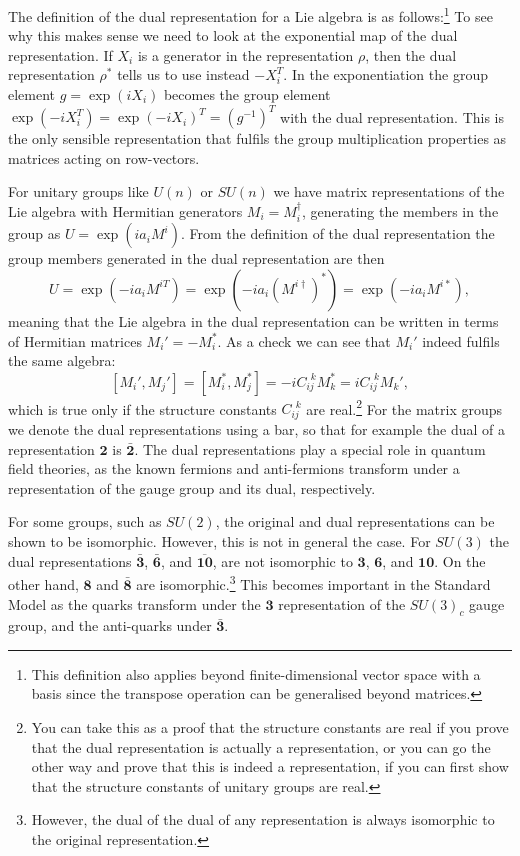 \documentclass[notes.tex]{subfiles}
\begin{document}
The definition of the dual representation for a Lie algebra is as follows:\footnote{This definition also applies beyond finite-dimensional vector space with a basis since the transpose operation can be generalised beyond matrices.}
To see why this makes sense we need to look at the exponential map of the dual representation. If $X_i$ is a generator in the representation $\rho$, then the dual representation $\rho^*$ tells us to use instead $-X_i^T$. In the exponentiation the group element $g=\exp(iX_i)$ becomes the group element $\exp(-iX_i^T)=\exp(-iX_i)^T=(g^{-1})^T$ with the dual representation. This is the only sensible representation that fulfils the group multiplication properties as matrices acting on row-vectors.

For unitary groups like $U(n)$ or $SU(n)$ we have matrix representations of the Lie algebra with Hermitian generators $M_i=M_i^\dagger$,  generating the members in the group as $U=\exp(ia_iM^i)$. From the definition of the dual representation the group members generated in the dual representation are then
\[ U=\exp(-ia_iM^{iT})=\exp(-ia_i(M^{i\dagger})^*)=\exp(-ia_iM^{i*}), \]
meaning that the Lie algebra in the dual representation can be written in terms of Hermitian matrices $M_i'=-M_i^*$. As a check we can see that $M_i'$ indeed fulfils the same algebra:
\[ [M_i',M_j']=[M_i^*,M_j^*]=-iC_{ij}^{~~k}M_k^*=iC_{ij}^{~~k}M_k',\] 
which is true only if the structure constants $C_{ij}^{~~k}$ are real.\footnote{You can take this as a proof that the structure constants are real if you prove that the dual representation is actually a representation, or you can go the other way and prove that this is indeed a representation, if you can first show that the structure constants of unitary groups are real.}
For the matrix groups we denote the dual representations using a bar, so that for example the dual of a representation $\mathbf 2$ is $\mathbf {\bar 2}$. The dual representations play a special role in quantum field theories, as the known fermions and anti-fermions transform under a representation of the gauge group and its dual, respectively.

For some groups, such as $SU(2)$, the original and dual representations can be shown to be isomorphic. However, this is not in general the case. For $SU(3)$ the dual representations $\mathbf {\bar 3}$, $\mathbf {\bar 6}$, and $\mathbf{\overline{10}}$, are not isomorphic to $\mathbf 3$, $\mathbf 6$, and $\mathbf{10}$. On the other hand, $\mathbf 8$ and $\mathbf {\bar 8}$ are isomorphic.\footnote{However, the dual of the dual of any representation is always isomorphic to the original representation.} This becomes important in the Standard Model as the quarks transform under the $\mathbf 3$ representation of the $SU(3)_c$ gauge group, and the anti-quarks under $\mathbf {\bar 3}$.
\end{document}
